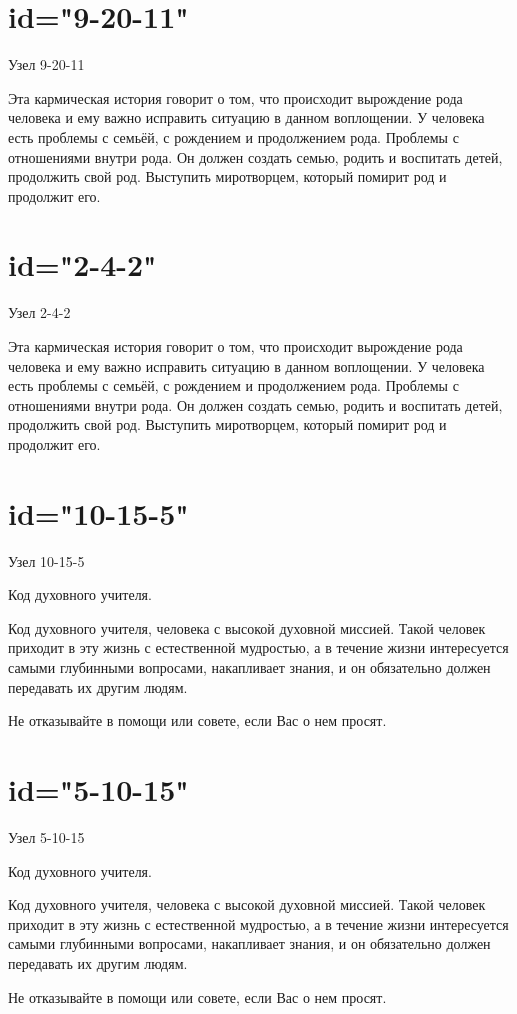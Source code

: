 \section{id="9-20-11"}{Узел 9-20-11}
\item Эта кармическая история говорит о том, что происходит вырождение рода человека и ему важно исправить ситуацию в данном воплощении. У человека есть проблемы с семьёй, с рождением и продолжением рода. Проблемы с отношениями внутри рода. Он должен создать семью, родить и воспитать детей, продолжить свой род. Выступить миротворцем, который помирит род и продолжит его.
\endsection

\section{id="2-4-2"}{Узел 2-4-2}
\item Эта кармическая история говорит о том, что происходит вырождение рода человека и ему важно исправить ситуацию в данном воплощении. У человека есть проблемы с семьёй, с рождением и продолжением рода. Проблемы с отношениями внутри рода. Он должен создать семью, родить и воспитать детей, продолжить свой род. Выступить миротворцем, который помирит род и продолжит его.
\endsection

\section{id="10-15-5"}{Узел 10-15-5}
\item Код духовного учителя.
\item Код духовного учителя, человека с высокой духовной миссией. Такой человек приходит в эту жизнь с естественной мудростью, а в течение жизни интересуется самыми глубинными вопросами, накапливает знания, и он обязательно должен передавать их другим людям.
\item Не отказывайте в помощи или совете, если Вас о нем просят.
\endsection

\section{id="5-10-15"}{Узел 5-10-15}
\item Код духовного учителя.
\item Код духовного учителя, человека с высокой духовной миссией. Такой человек приходит в эту жизнь с естественной мудростью, а в течение жизни интересуется самыми глубинными вопросами, накапливает знания, и он обязательно должен передавать их другим людям.
\item Не отказывайте в помощи или совете, если Вас о нем просят.
\endsection

